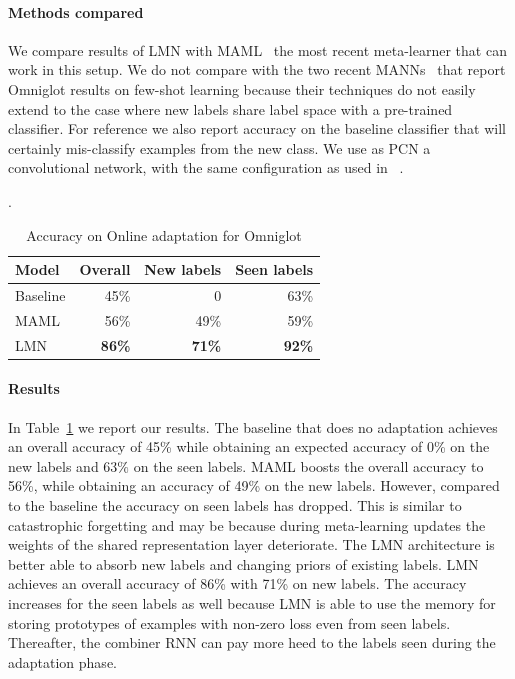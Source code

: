 \documentclass[letterpaper]{article} %
\begin{document}
\paragraph{Methods compared} We compare results of LMN with MAML~\cite{Finn2017ModelAgnosticMF} the most recent meta-learner that can work in this setup. We do not compare with the two recent MANNs~  that report Omniglot results on few-shot learning because their techniques do not easily extend to the case where new labels share label space with a pre-trained classifier. For reference we also report accuracy on the baseline classifier that will certainly mis-classify examples from the new class. We use as PCN a convolutional network, with the same configuration as used in ~.

.
\begin{table}[!htb]
      \centering
        \begin{tabular}{|l|r|r|r|} \hline
Model & Overall & New labels & Seen labels \\ \hline
Baseline & 45\% & 0 & 63\% \\
MAML & 56\% & 49\% & 59\%\\
LMN  & {\bf 86\%} & {\bf 71\%} & {\bf 92\%} \\  \hline
\end{tabular}
 \caption{\label{tab-unk}Accuracy on Online adaptation for Omniglot}
\end{table}
\paragraph{Results}
In Table~\ref{tab-unk} we report our results.  The baseline that does no adaptation achieves an overall accuracy of 45\% while obtaining an expected accuracy of 0\% on the new labels and $63\%$ on the seen labels.  MAML boosts the overall accuracy to 56\%, while obtaining an accuracy of 49\% on the new labels.  However, compared to the baseline the accuracy on seen labels has dropped. This is similar to catastrophic forgetting  and may be because during meta-learning updates the weights of the shared representation layer deteriorate.
The LMN architecture is better able to absorb new labels and changing priors of existing labels.  LMN achieves an overall accuracy of 86\% with 71\% on new labels. The accuracy increases for the seen labels as well because LMN is able to use the memory for storing prototypes of examples with non-zero loss even from seen labels. Thereafter, the combiner RNN can pay more heed to the labels seen during the adaptation phase.
\end{document}
